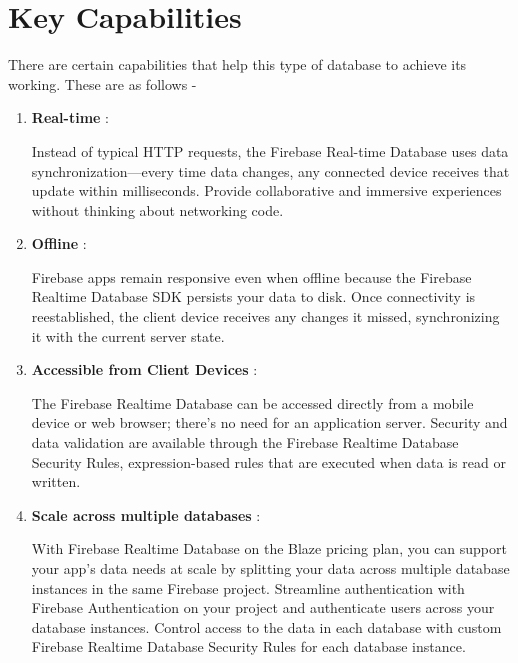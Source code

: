 \documentclass[12pt,a4paper]{report}
\begin{document}
\section{{\fontsize{16}{0}\selectfont Key Capabilities}}
{\fontsize{14}{0}\selectfont
\noindent
There are certain capabilities that help this type of database to achieve its working. These are as follows - 
\vspace{.5cm}

\begin{enumerate}
  \item  \textbf{Real-time} : %
  
  {\fontsize{14}{0}\selectfont Instead of typical \ac{HTTP} requests, the Firebase Real-time Database uses data synchronization—every time data changes, any connected device receives that update within milliseconds. Provide collaborative and immersive experiences without thinking about networking code.}
  
  \item \textbf{Offline} : 
  
  {\fontsize{14}{0}\selectfont Firebase apps remain responsive even when offline because the Firebase Realtime Database \ac{SDK} persists your data to disk. Once connectivity is reestablished, the client device receives any changes it missed, synchronizing it with the current server state.}
  
  \item \textbf{Accessible from Client Devices} :
  
  {\fontsize{14}{0}\selectfont The Firebase Realtime Database can be accessed directly from a mobile device or web browser; there’s no need for an application server. Security and data validation are available through the Firebase Realtime Database Security Rules, expression-based rules that are executed when data is read or written.}


  \item \textbf{Scale across multiple databases} :
  
  {\fontsize{14}{0}\selectfont With Firebase Realtime Database on the Blaze pricing plan, you can support your app's data needs at scale by splitting your data across multiple database instances in the same Firebase project. Streamline authentication with Firebase Authentication on your project and authenticate users across your database instances. Control access to the data in each database with custom Firebase Realtime Database Security Rules for each database instance.}
  
  
\end{enumerate}
}
\end{document}

